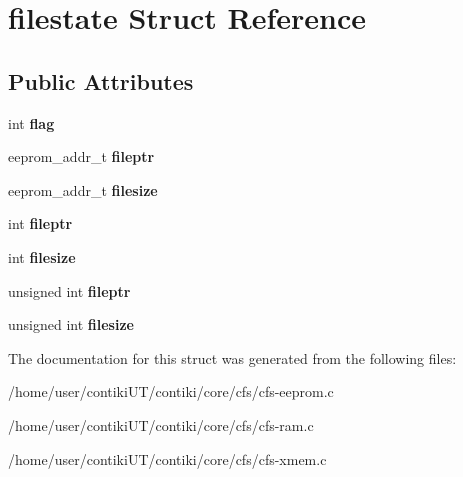 \hypertarget{structfilestate}{}\section{filestate Struct Reference}
\label{structfilestate}
\subsection*{Public Attributes}
\begin{DoxyCompactItemize}
\item 
\hypertarget{structfilestate_adeb341a121ec565b739b1a78b95f245e}{}int {\bfseries flag}\label{structfilestate_adeb341a121ec565b739b1a78b95f245e}

\item 
\hypertarget{structfilestate_a6192101a7db6e5052153e9b64937cc4d}{}eeprom\+\_\+addr\+\_\+t {\bfseries fileptr}\label{structfilestate_a6192101a7db6e5052153e9b64937cc4d}

\item 
\hypertarget{structfilestate_afc4fcb87e7d8694b5dd4b1478e47cbd0}{}eeprom\+\_\+addr\+\_\+t {\bfseries filesize}\label{structfilestate_afc4fcb87e7d8694b5dd4b1478e47cbd0}

\item 
\hypertarget{structfilestate_a350f89a1f35e906c46791a8800034df3}{}int {\bfseries fileptr}\label{structfilestate_a350f89a1f35e906c46791a8800034df3}

\item 
\hypertarget{structfilestate_a5616ff7d40d27276a552173dbd02fab4}{}int {\bfseries filesize}\label{structfilestate_a5616ff7d40d27276a552173dbd02fab4}

\item 
\hypertarget{structfilestate_ae877d9648ee673e202250cc220c05150}{}unsigned int {\bfseries fileptr}\label{structfilestate_ae877d9648ee673e202250cc220c05150}

\item 
\hypertarget{structfilestate_a61665a2294783f62a66c43daafdf0351}{}unsigned int {\bfseries filesize}\label{structfilestate_a61665a2294783f62a66c43daafdf0351}

\end{DoxyCompactItemize}


The documentation for this struct was generated from the following files\+:\begin{DoxyCompactItemize}
\item 
/home/user/contiki\+U\+T/contiki/core/cfs/cfs-\/eeprom.\+c\item 
/home/user/contiki\+U\+T/contiki/core/cfs/cfs-\/ram.\+c\item 
/home/user/contiki\+U\+T/contiki/core/cfs/cfs-\/xmem.\+c\end{DoxyCompactItemize}
